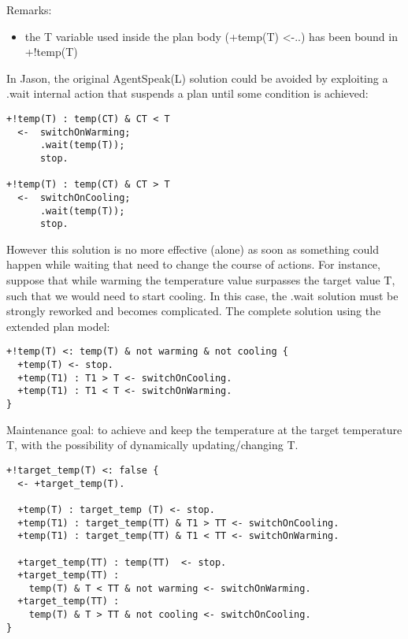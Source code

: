 Remarks:
\begin{itemize}
\item the T variable used inside the plan body (+temp(T) <-..) has been bound in +!temp(T)
\end{itemize}

\noindent  In Jason, the original AgentSpeak(L) solution could be avoided  by exploiting a .wait internal action that suspends a plan until some condition is achieved:

{\small
\begin{verbatim}
+!temp(T) : temp(CT) & CT < T 
  <-  switchOnWarming;
      .wait(temp(T));
      stop.

+!temp(T) : temp(CT) & CT > T 
  <-  switchOnCooling;
      .wait(temp(T));
      stop.
\end{verbatim}}

\noindent However this solution is no more effective (alone) as soon as something could happen while waiting that need to change the course of actions.  
%
For instance, suppose that while warming the temperature value surpasses the target value T, such that we would need to start cooling. In this case, the .wait solution must be strongly reworked and becomes complicated.
%
The complete solution using the extended plan model:

{\small
\begin{verbatim}
+!temp(T) <: temp(T) & not warming & not cooling {
  +temp(T) <- stop.		
  +temp(T1) : T1 > T <- switchOnCooling.
  +temp(T1) : T1 < T <- switchOnWarming.
}
\end{verbatim}
}


\noindent Maintenance goal: to achieve and keep the temperature at the target temperature T, with the possibility of dynamically updating/changing T.

{\small
\begin{verbatim}
+!target_temp(T) <: false {
  <- +target_temp(T).	
 
  +temp(T) : target_temp (T) <- stop.		
  +temp(T1) : target_temp(TT) & T1 > TT <- switchOnCooling.	  
  +temp(T1) : target_temp(TT) & T1 < TT <- switchOnWarming.
 
  +target_temp(TT) : temp(TT)  <- stop.	
  +target_temp(TT) : 
    temp(T) & T < TT & not warming <- switchOnWarming.
  +target_temp(TT) : 
    temp(T) & T > TT & not cooling <- switchOnCooling.
}
\end{verbatim}}

